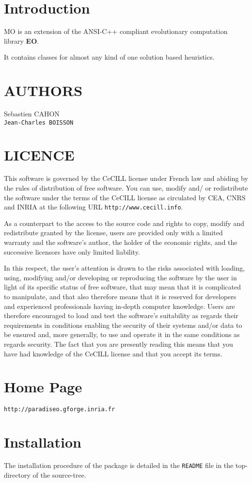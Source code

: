\section{Introduction}\label{main_Introduction}
MO is an extension of the ANSI-C++ compliant evolutionary computation library {\bf EO}. \par
 It contains classes for almost any kind of one solution based heuristics.\section{AUTHORS}\label{main_authors}
\begin{TabularC}{1}
\hline
Sebastien CAHON  \\\hline
{\tt Jean-Charles BOISSON}  \\\hline
\end{TabularC}
\section{LICENCE}\label{main_LICENCE}
This software is governed by the CeCILL license under French law and abiding by the rules of distribution of free software. You can use, modify and/ or redistribute the software under the terms of the CeCILL license as circulated by CEA, CNRS and INRIA at the following URL {\tt http://www.cecill.info}.

As a counterpart to the access to the source code and rights to copy, modify and redistribute granted by the license, users are provided only with a limited warranty and the software's author, the holder of the economic rights, and the successive licensors have only limited liability.

In this respect, the user's attention is drawn to the risks associated with loading, using, modifying and/or developing or reproducing the software by the user in light of its specific status of free software, that may mean that it is complicated to manipulate, and that also therefore means that it is reserved for developers and experienced professionals having in-depth computer knowledge. Users are therefore encouraged to load and test the software's suitability as regards their requirements in conditions enabling the security of their systems and/or data to be ensured and, more generally, to use and operate it in the same conditions as regards security. The fact that you are presently reading this means that you have had knowledge of the CeCILL license and that you accept its terms.\section{Home Page}\label{main_Paradiseo}
{\tt http://paradiseo.gforge.inria.fr}\section{Installation}\label{main_Installation}
The installation procedure of the package is detailed in the {\tt README} file in the top-directory of the source-tree. 